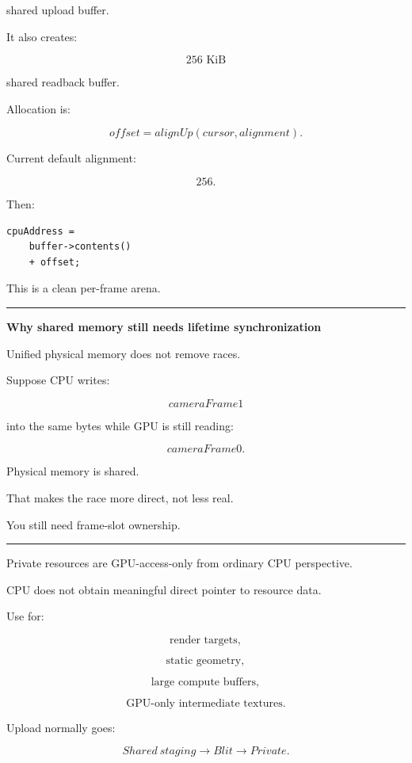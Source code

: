 shared upload buffer.

It also creates:

\[
256\text{ KiB}
\]

shared readback buffer.

Allocation is:

\[
offset=
alignUp(cursor,alignment).
\]

Current default alignment:

\[
256.
\]

Then:

\begin{verbatim}
cpuAddress =
    buffer->contents()
    + offset;
\end{verbatim}

This is a clean per-frame arena.

\begin{center}\rule{0.5\linewidth}{0.5pt}\end{center}

\textbf{Why shared memory still needs lifetime synchronization}

Unified physical memory does not remove races.

Suppose CPU writes:

\[
cameraFrame1
\]

into the same bytes while GPU is still reading:

\[
cameraFrame0.
\]

Physical memory is shared.

That makes the race more direct, not less real.

You still need frame-slot ownership.

\begin{center}\rule{0.5\linewidth}{0.5pt}\end{center}

\textbf{}

Private resources are GPU-access-only from ordinary CPU perspective.

CPU does not obtain meaningful direct pointer to resource data.

Use for:

\[
\text{render targets},
\]

\[
\text{static geometry},
\]

\[
\text{large compute buffers},
\]

\[
\text{GPU-only intermediate textures}.
\]

Upload normally goes:

\[
Shared\ staging
\rightarrow
Blit
\rightarrow
Private.
\]

